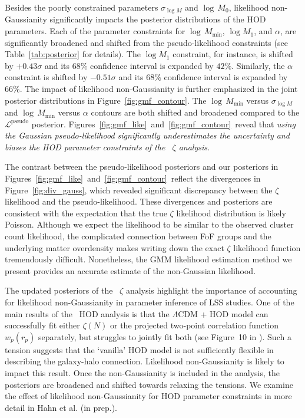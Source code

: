 \documentclass[12pt, letterpaper, preprint]{aastex6}
\newcommand{\Sinh}{\citetalias{sinha2017}\xspace}
\newcommand{\lss}{{\small{LSS}}\xspace}
\newcommand{\gmm}{{\small{GMM}}\xspace}
\begin{document}
Besides the poorly constrained parameters $\sigma_{\log M}$ and $\log\, M_0$, 
likelihood non-Gaussianity significantly impacts the posterior 
distributions of the HOD parameters. Each of the parameter constraints 
for $\log\,M_\mathrm{min}$, $\log M_1$, and $\alpha$, are significantly 
broadened and shifted from the pseudo-likelihood constraints
(see Table~\ref{tab:posterior} for details). The $\log M_1$ constraint, 
for instance, is shifted by $+0.43 \sigma$ and its $68\%$ confidence
interval is expanded by $42\%$. Similarly, the $\alpha$ constraint is
shifted by $-0.51 \sigma$ and its $68\%$ confidence interval is expanded 
by $66\%$. The impact of likelihood non-Gaussianity is further emphasized in 
the joint posterior distributions in Figure~\ref{fig:gmf_contour}.
The $\log\,M_\mathrm{min}$ versus $\sigma_{\log M}$ and 
$\log\,M_\mathrm{min}$ versus $\alpha$ contours are both shifted 
and broadened compared to the $\mathcal{L}^\mathrm{pseudo}$ 
posterior. Figures~\ref{fig:gmf_like}~and~\ref{fig:gmf_contour}~reveal 
that \emph{using the Gaussian pseudo-likelihood significantly 
underestimates the uncertainty and biases the HOD parameter constraints 
of the \Sinh~$\zeta$ analysis.}

The contrast between the pseudo-likelihood posteriors and our posteriors
in Figures~\ref{fig:gmf_like}~and~\ref{fig:gmf_contour}~reflect 
the divergences in Figure~\ref{fig:div_gauss}, which revealed significant
discrepancy between the $\zeta$ likelihood and the pseudo-likelihood. 
These divergences and posteriors are consistent with the expectation 
that the true $\zeta$ likelihood distribution is likely Poisson. Although 
we expect the likelihood to be similar to the observed cluster count likelihood, 
the complicated connection between FoF groups and the underlying 
matter overdensity makes writing down the exact $\zeta$ likelihood function 
tremendously difficult. Nonetheless, the \gmm likelihood estimation method we 
present provides an accurate estimate of the non-Gaussian likelihood. 

The updated posteriors of the \Sinh~$\zeta$ analysis highlight the importance of 
accounting for likelihood non-Gaussianity in parameter inference of 
\lss studies. One of the main results of the \Sinh~HOD analysis 
is that the $\Lambda$CDM + HOD model can successfully 
fit either $\zeta(N)$ or the projected two-point correlation function 
$w_p(r_p)$ separately, but struggles to jointly fit both (see Figure~10 in \Sinh). 
Such a tension suggests that the `vanilla' HOD model is not sufficiently 
flexible in describing the galaxy-halo connection. Likelihood non-Gaussianity
is likely to impact this result. Once the non-Gaussianity is included in 
the analysis, the posteriors are broadened and shifted towards 
relaxing the tensions. We examine the effect of likelihood non-Gaussianity 
for HOD parameter constraints in more detail in Hahn et al. (in prep.). 
\end{document}
